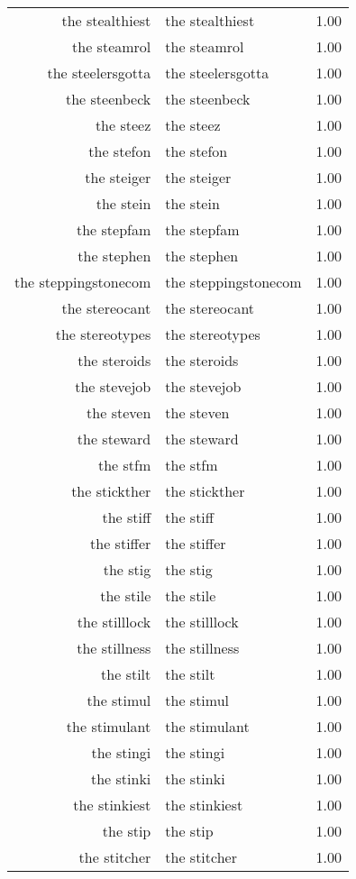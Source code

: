 \begin{table}[ht]
\begin{tabular}{rlr}
  the stealthiest & the stealthiest & 1.00 \\ 
  the steamrol & the steamrol & 1.00 \\ 
  the steelersgotta & the steelersgotta & 1.00 \\ 
  the steenbeck & the steenbeck & 1.00 \\ 
  the steez & the steez & 1.00 \\ 
  the stefon & the stefon & 1.00 \\ 
  the steiger & the steiger & 1.00 \\ 
  the stein & the stein & 1.00 \\ 
  the stepfam & the stepfam & 1.00 \\ 
  the stephen & the stephen & 1.00 \\ 
  the steppingstonecom & the steppingstonecom & 1.00 \\ 
  the stereocant & the stereocant & 1.00 \\ 
  the stereotypes & the stereotypes & 1.00 \\ 
  the steroids & the steroids & 1.00 \\ 
  the stevejob & the stevejob & 1.00 \\ 
  the steven & the steven & 1.00 \\ 
  the steward & the steward & 1.00 \\ 
  the stfm & the stfm & 1.00 \\ 
  the stickther & the stickther & 1.00 \\ 
  the stiff & the stiff & 1.00 \\ 
  the stiffer & the stiffer & 1.00 \\ 
  the stig & the stig & 1.00 \\ 
  the stile & the stile & 1.00 \\ 
  the stilllock & the stilllock & 1.00 \\ 
  the stillness & the stillness & 1.00 \\ 
  the stilt & the stilt & 1.00 \\ 
  the stimul & the stimul & 1.00 \\ 
  the stimulant & the stimulant & 1.00 \\ 
  the stingi & the stingi & 1.00 \\ 
  the stinki & the stinki & 1.00 \\ 
  the stinkiest & the stinkiest & 1.00 \\ 
  the stip & the stip & 1.00 \\ 
  the stitcher & the stitcher & 1.00 \\ 

\end{tabular}
\end{table}
